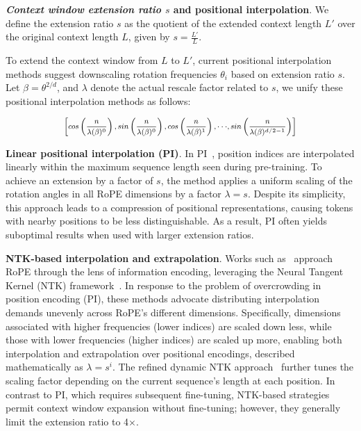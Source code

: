 \textbf{\emph{Context window extension ratio $s$} and positional interpolation}. We define the extension ratio $s$ as the quotient of the extended context length $L'$ over the original context length $L$, given by $s=\frac{L'}{L}$.

To extend the context window from $L$ to $L'$, current positional interpolation methods suggest downscaling rotation frequencies $\theta_i$ based on extension ratio $s$. Let $\beta=\theta^{2/d}$, and $\lambda$ denote the actual rescale factor related to $s$, we   unify these positional interpolation methods as follows:

\begin{equation}	
	\fontsize{7.5}{7.5} \selectfont
	\label{eq:unified_rope}
	\begin{aligned}
		\left[cos\left(\frac{n}{\lambda(\beta)^0}\right), sin \left(\frac{n}{\lambda(\beta)^0}\right), cos\left(\frac{n}{\lambda(\beta)^1}\right), \cdot\cdot\cdot,  sin \left(\frac{n}{\lambda(\beta)^{d/2-1}}\right) \right]   
	\end{aligned}
\end{equation}

\textbf{Linear positional interpolation (PI)}. In PI~\cite{pi}, position indices are interpolated linearly within the maximum sequence length seen during pre-training. To achieve an extension by a factor of $s$, the method applies a uniform scaling of the rotation angles in all RoPE dimensions by a factor $\lambda=s$. Despite its simplicity, this approach leads to a compression of positional representations, causing tokens with nearby positions to be less distinguishable. As a result, PI often yields suboptimal results when used with larger extension ratios.

\textbf{NTK-based interpolation and extrapolation}. Works such as~\cite{ntk,dynamicntk} approach RoPE through the lens of information encoding, leveraging the Neural Tangent Kernel (NTK) framework~\cite{jacot2018neural,tancik2020fourier}. In response to the problem of overcrowding in position encoding (PI), these methods advocate distributing interpolation demands unevenly across RoPE’s different dimensions. Specifically, dimensions associated with higher frequencies (lower indices) are scaled down less, while those with lower frequencies (higher indices) are scaled up more, enabling both interpolation and extrapolation over positional encodings, described mathematically as $\lambda=s^{i}$. The refined dynamic NTK approach~\cite{dynamicntk} further tunes the scaling factor depending on the current sequence’s length at each position. In contrast to PI, which requires subsequent fine-tuning, NTK-based strategies permit context window expansion without fine-tuning; however, they generally limit the extension ratio to 4$\times$.

